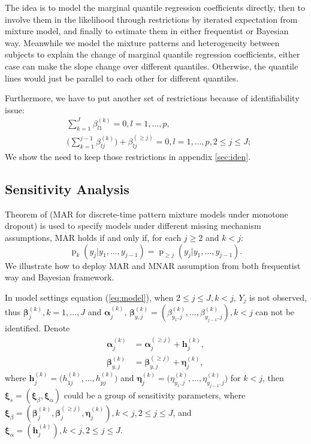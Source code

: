 \documentclass[12pt]{article}
\DeclareMathOperator{\pr}{p}
\begin{document}
The idea is to model the marginal quantile regression
coefficients directly, then to involve them in the likelihood through
restrictions by iterated expectation from mixture model, and finally
to estimate them in either frequentist or Bayesian way. Meanwhile we
model the mixture patterns and heterogeneity between subjects to
explain the change of marginal quantile regression coefficients,
either case can make the slope change over different
quantiles. Otherwise, the quantile lines would just be parallel to
each other for different quantiles.

Furthermore, we have to put another set of restrictions because of
identifiability issue:
\begin{align*}
  & \sum_{k=1}^J \beta_{l1}^{(k)} = 0, l = 1,\ldots, p, \\
  & \big( \sum_{k=1}^{j-1} \beta_{lj}^{(k)} \big) + \beta_{lj}^{(\geq j)} = 0, l = 1, \ldots, p,
  2 \leq j \leq J;
\end{align*}
We show the need to keep those restrictions
in appendix \ref{sec:iden}.

\subsection{Sensitivity Analysis}
\label{sec:sa}

Theorem of \citet{molen1998} (MAR for
discrete-time pattern mixture models under monotone dropout) is used
to specify models under different missing mechanism assumptions, MAR
holds if and only if, for each $j \geq 2$ and $k < j$:
\begin{equation}
  \label{eq:molen}
  \pr_k(y_j|y_1, \ldots, y_{j-1}) = \pr_{\geq j}(y_j|y_1, \ldots, y_{j-1}).
\end{equation}
We illustrate how to deploy MAR and MNAR assumption from both
frequentist way and Bayesian framework.

In model settings equation (\ref{eq:model}), when $2 \leq j \leq J, k
< j$, $Y_j$ is not observed, thus $\bm \beta_j^{(k)}, k = 1, \ldots,
J$ and $\bm \alpha_j^{(k)}$, $ \bm \beta_{y, j}^{(k)} =
(\beta_{y_1,j}^{(k)}, \ldots, \beta_{y_{j-1},j}^{(k)}), k < j$ can not
be identified. Denote
\begin{align*}
  \bm \alpha_j^{(k)} &= \bm \alpha_j^{(\geq j)} + \bm h_j^{(k)}, \\
  \bm \beta_{y, j}^{(k)} &= \bm \beta_{y, j}^{(\geq j)} + \bm
  \eta_j^{(k)},
\end{align*}
where $\bm h_j^{(k)} = \big( h_{1j}^{(k)}, \ldots, h_{pj}^{(k)} \big)$
and $\bm \eta_j^{(k)} = \big( \eta_{y_1,j}^{(k)}, \ldots,
\eta_{y_{j-1}, j}^{(k)} \big)$ for $k < j$, then $\bm \xi_s = ( \bm
\xi_{\beta} , \bm \xi_{\alpha})$ could be a group of sensitivity
parameters, where $\bm \xi_{\beta} = (\bm \beta_j^{(k)}, \bm
\beta_j^{(\geq j)}, \bm \eta_j^{(k)}), k < j, 2 \leq j \leq J $, and
$\bm \xi_{\alpha} = (\bm h_j^{(k)}) , k < j, 2 \leq j \leq J$.
\end{document}
